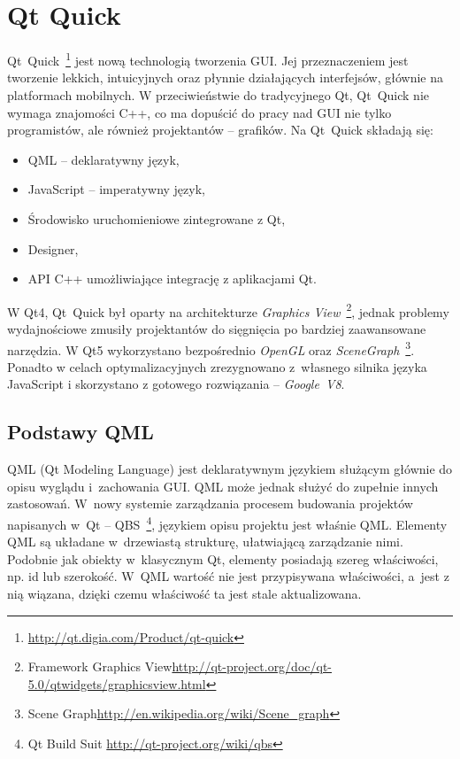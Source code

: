 \section{Qt Quick}
Qt~Quick~\footnote{\url{http://qt.digia.com/Product/qt-quick}} jest nową technologią tworzenia GUI. Jej przeznaczeniem jest tworzenie lekkich, intuicyjnych oraz płynnie działających interfejsów, głównie na platformach mobilnych. W przeciwieństwie do tradycyjnego Qt, Qt~Quick nie wymaga znajomości C++, co ma dopuścić do pracy nad GUI nie tylko programistów, ale również projektantów -- grafików.
Na Qt~Quick składają się:
\begin{itemize}
\item QML -- deklaratywny język,
\item JavaScript -- imperatywny język,
\item Środowisko uruchomieniowe zintegrowane z Qt,
\item Designer,
\item API C++ umożliwiające integrację z aplikacjami Qt.
\end{itemize}

W Qt4, Qt~Quick był oparty na architekturze \textit{Graphics View}~\footnote{Framework Graphics View\url{http://qt-project.org/doc/qt-5.0/qtwidgets/graphicsview.html}}, jednak problemy wydajnościowe zmusiły projektantów do sięgnięcia po bardziej zaawansowane narzędzia. W Qt5 wykorzystano bezpośrednio \textit{OpenGL} oraz \textit{SceneGraph}~\footnote{Scene Graph\url{http://en.wikipedia.org/wiki/Scene\_graph}}. Ponadto w celach optymalizacyjnych zrezygnowano z~własnego silnika języka JavaScript i skorzystano z gotowego rozwiązania -- \textit{Google~V8}.

\subsection{Podstawy QML}
QML (Qt Modeling Language) jest deklaratywnym językiem służącym głównie do opisu wyglądu i~zachowania GUI. QML może jednak służyć do zupełnie innych zastosowań. W~nowy systemie zarządzania procesem budowania projektów napisanych w~Qt -- QBS~\footnote{Qt Build Suit \url{http://qt-project.org/wiki/qbs}}, językiem opisu projektu jest właśnie QML.  
Elementy QML są układane w~drzewiastą strukturę, ułatwiającą zarządzanie nimi. Podobnie jak obiekty w~klasycznym Qt, elementy posiadają szereg właściwości, np. id lub szerokość. W~QML wartość nie jest przypisywana właściwości, a~jest z nią wiązana, dzięki czemu właściwość ta jest stale aktualizowana.

